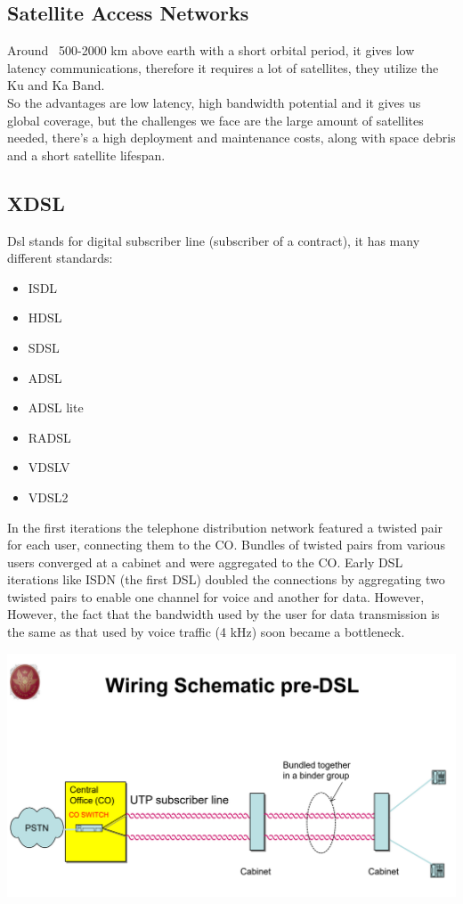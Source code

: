\documentclass[11pt, a4paper]{article}
\begin{document}
\subsection{Satellite Access Networks}
Around ~500-2000 km above earth with a short orbital period, it gives low latency communications, therefore it requires a lot of satellites, they utilize the Ku and Ka Band.\\
So the advantages are low latency, high bandwidth potential and it gives us global coverage, but the challenges we face are the large amount of satellites needed, there's a high deployment and maintenance costs, along with space debris and a short satellite lifespan.\\
\subsection{XDSL}
Dsl stands for digital subscriber line (subscriber of a contract), it has many different standards:
\begin{itemize}
    \item ISDL 
    \item HDSL
    \item SDSL
    \item ADSL
    \item ADSL lite
    \item RADSL
    \item VDSLV
    \item VDSL2
\end{itemize}
In the first iterations the telephone distribution network featured a twisted pair for each user, connecting them to the
CO. Bundles of twisted pairs from various users converged at a cabinet and were aggregated to
the CO. Early DSL iterations like ISDN (the first DSL) doubled the connections by aggregating
two twisted pairs to enable one channel for voice and another for data. However, However, the
fact that the bandwidth used by the user for data transmission is the same as that used by voice
traffic (4 kHz) soon became a bottleneck.
\begin{center}
    \includegraphics[scale=0.5]{img/AccessNetworks/XDSL/Schematic.png}
\end{center}
\end{document}
